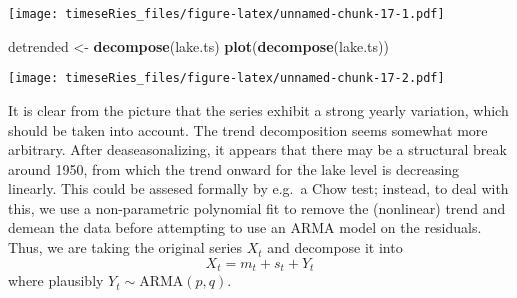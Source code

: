 \documentclass[]{book}
\newenvironment{Shaded}{\begin{snugshade}}{\end{snugshade}}
\newcommand{\DataTypeTok}[1]{\textcolor[rgb]{0.13,0.29,0.53}{#1}}
\newcommand{\DecValTok}[1]{\textcolor[rgb]{0.00,0.00,0.81}{#1}}
\newcommand{\KeywordTok}[1]{\textcolor[rgb]{0.13,0.29,0.53}{\textbf{#1}}}
\newcommand{\NormalTok}[1]{#1}
\newcommand{\OperatorTok}[1]{\textcolor[rgb]{0.81,0.36,0.00}{\textbf{#1}}}
\newcommand{\OtherTok}[1]{\textcolor[rgb]{0.56,0.35,0.01}{#1}}
\newcommand{\StringTok}[1]{\textcolor[rgb]{0.31,0.60,0.02}{#1}}
\begin{document}
\begin{Shaded}
\end{Shaded}

\texttt{[image: timeseRies\_files/figure-latex/unnamed-chunk-17-1.pdf]}

\begin{Shaded}
\begin{Highlighting}[]
\NormalTok{detrended <-}\StringTok{ }\KeywordTok{decompose}\NormalTok{(lake.ts)}
\KeywordTok{plot}\NormalTok{(}\KeywordTok{decompose}\NormalTok{(lake.ts))}
\end{Highlighting}
\end{Shaded}

\texttt{[image: timeseRies\_files/figure-latex/unnamed-chunk-17-2.pdf]}

It is clear from the picture that the series exhibit a strong yearly
variation, which should be taken into account. The trend decomposition
seems somewhat more arbitrary. After deaseasonalizing, it appears that
there may be a structural break around 1950, from which the trend onward
for the lake level is decreasing linearly. This could be assesed
formally by e.g.~a Chow test; instead, to deal with this, we use a
non-parametric polynomial fit to remove the (nonlinear) trend and demean
the data before attempting to use an ARMA model on the residuals. Thus,
we are taking the original series \(X_t\) and decompose it into
\[X_t=m_t+s_t+Y_t\] where plausibly \(Y_t \sim \mathrm{ARMA}(p,q)\).
\end{document}
